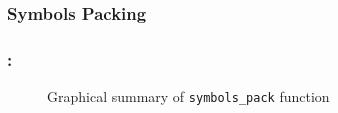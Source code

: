 \documentclass[class=beamer,10pt,crop=false]{standalone}
\begin{document}
\subsubsection{Symbols Packing}
\begin{frame}
    \label{slide:dab-proc_symbols-pack}
    \frametitle{\subsecname : \subsubsecname}
    
    \begin{figure}[htbp]
        \centering
        \captionsetup{type=figure}
        \def\svgwidth{\linewidth}
        {\linespread{0.8}
            \scriptsize
            }
        \caption{Graphical summary of \texttt{symbols\_pack} function}
        \label{fig:symbols_pack}
      \end{figure}
      
\end{frame}
\end{document}
